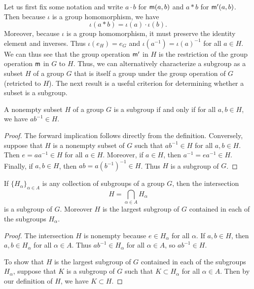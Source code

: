 Let us first fix some notation and write \(a \cdot b\) for \({\mathsf{m}}(a,b)\) and
\(a * b\) for \({\mathsf{m}}'(a,b)\). Then because \(\iota\) is a group homomorphism,
we have
\[
    \iota(a * b) = \iota(a) \cdot \iota(b).
\]
Moreover, because \(\iota\) is a group homomorphism, it must preserve the
identity element and inverses. Thus \(\iota(e_H) = e_G\) and \(\iota(a^{-1}) =
\iota(a)^{-1}\) for all \(a \in H\). We can thus see that the group operation
\({\mathsf{m}}'\) in \(H\) is the restriction of the group operation \({\mathsf{m}}\) in \(G\)
to \(H\). Thus, we can alternatively characterize a subgroup as a subset \(H\)
of a group \(G\) that is itself a group under the
group operation of \(G\) (retricted to \(H\)). The next result is a useful
criterion for determining whether a subset is a subgroup.

\begin{theorem}
    \label{thm:subgroup-test}
    A nonempty subset \(H\) of a group \(G\) is a subgroup if and only if for
    all \(a, b \in H\), we have \(ab^{-1} \in H\).
\end{theorem}

\begin{proof}
    The forward implication follows directly from the definition. Conversely,
    suppose that \(H\) is a nonempty subset of \(G\) such that \(ab^{-1} \in H\)
    for all \(a, b \in H\). Then \(e = aa^{-1} \in H\) for all \(a \in H\).
    Moreover, if \(a \in H\), then \(a^{-1} = ea^{-1} \in H\). Finally, if \(a,
    b \in H\), then \(ab = a(b^{-1})^{-1} \in H\). Thus \(H\) is a subgroup of
    \(G\).
\end{proof}

\begin{theorem}
    \label{thm:intersection-subgroups}
    If \(\{H_{\alpha}\}_{\alpha \in A}\) is any collection of subgroups of a
    group \(G\), then the intersection
    \[
        H = \bigcap_{\alpha \in A} H_{\alpha}
    \]
    is a subgroup of \(G\). Moreover \(H\) is the largest subgroup of \(G\)
    contained in each of the subgroups \(H_{\alpha}\).
\end{theorem}

\begin{proof}
    The intersection \(H\) is nonempty because \(e \in H_\alpha\) for all
    \(\alpha\). If \(a, b \in H\), then \(a, b \in H_\alpha\) for all \(\alpha
    \in A\). Thus \(ab^{-1} \in H_\alpha\) for all \(\alpha \in A\), so
    \(ab^{-1} \in H\).

    To show that \(H\) is the largest subgroup of \(G\) contained in each of the
    subgroups \(H_{\alpha}\), suppose that \(K\) is a subgroup of \(G\) such
    that \(K \subset H_{\alpha}\) for all \(\alpha \in A\). Then by our
    definition of \(H\), we have \(K \subset H\).
\end{proof}

